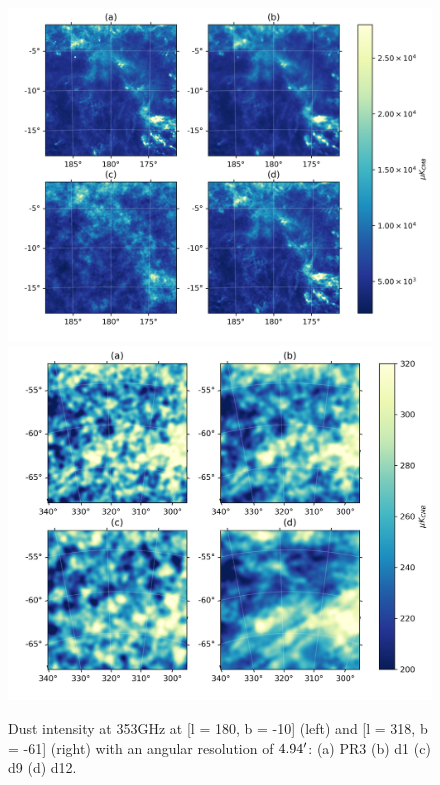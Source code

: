 \documentclass[twocolumn]{aastex631}
\begin{document}
\begin{figure}[t!]
    \centering
    \includegraphics[height=0.4\textwidth]{figures/gal_plane_non_smooth_wo_zero_lvl.png}
    \includegraphics[height=0.4\textwidth]{figures/BK_smooth_30'_wo_zero_lvl.png}
\caption{Dust intensity at 353GHz at [l = 180, b = -10] (left) and [l = 318, b = -61] (right) with an angular resolution of $4.94\mbox{$^\prime$}$: (a) PR3 (b) d1 (c) d9 (d) d12.}    
\label{fig:353_int}
\end{figure}
\end{document}
